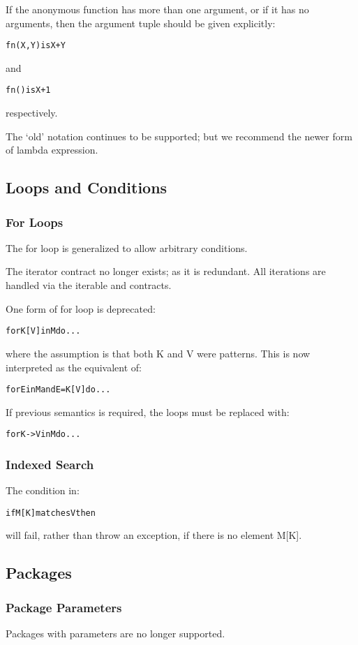 If the anonymous function has more than one argument, or if it has no arguments, then the argument tuple should be given explicitly:
\begin{alltt}
fn(X,Y) is X+Y
\end{alltt}
and
\begin{alltt}
fn() is X+1
\end{alltt}
respectively.

The `old' notation continues to be supported; but we recommend the newer form of lambda expression.

\subsection{Loops and Conditions}

\subsubsection{For Loops}
The for loop is generalized to allow arbitrary conditions.

The iterator contract no longer exists; as it is redundant. All iterations are handled via the iterable and  contracts.

One form of for loop is deprecated:
\begin{alltt}
for K[V] in M do ...
\end{alltt}
where the assumption is that both K and V were patterns. This is now interpreted as the equivalent of:
\begin{alltt}
for E in M and E=K[V] do ...
\end{alltt}
If previous semantics is required, the loops must be replaced with:
\begin{alltt}
for K->V in M do ...
\end{alltt}

\subsubsection{Indexed Search}
The condition in:
\begin{alltt}
if M[K] matches V then 
\end{alltt}
will fail, rather than throw an exception, if there is no element M[K].

\subsection{Packages}

\subsubsection{Package Parameters}
Packages with parameters are no longer supported.

